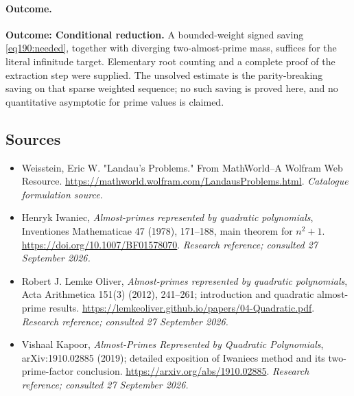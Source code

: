 \documentclass[11pt,a4paper]{article}
\numberwithin{equation}{section}
\begin{document}
\paragraph{Outcome.}
\textbf{Outcome: Conditional reduction.}
A bounded-weight signed saving \eqref{eq190:needed}, together with diverging two-almost-prime mass, suffices for the literal infinitude target. Elementary root counting and a complete proof of the extraction step were supplied. The unsolved estimate is the parity-breaking saving on that sparse weighted sequence; no such saving is proved here, and no quantitative asymptotic for prime values is claimed.

\subsection{Sources}
\begin{itemize}\raggedright
\item[\textnormal{[S1]}]\hypertarget{source:47:1}{} Weisstein, Eric W. "Landau's Problems." From MathWorld--A Wolfram Web Resource.
\url{https://mathworld.wolfram.com/LandausProblems.html}.
{\small\textit{Catalogue formulation source.}}
\item[\textnormal{[E1]}]\hypertarget{extra:47:1}{} Henryk Iwaniec, \emph{Almost-primes represented by quadratic polynomials}, Inventiones Mathematicae 47 (1978), 171--188, main theorem for $n^2+1$.
\url{https://doi.org/10.1007/BF01578070}.
{\small\textit{Research reference; consulted 27 September 2026.}}
\item[\textnormal{[E2]}]\hypertarget{extra:47:2}{} Robert J. Lemke Oliver, \emph{Almost-primes represented by quadratic polynomials}, Acta Arithmetica 151(3) (2012), 241--261; introduction and quadratic almost-prime results.
\url{https://lemkeoliver.github.io/papers/04-Quadratic.pdf}.
{\small\textit{Research reference; consulted 27 September 2026.}}
\item[\textnormal{[E3]}]\hypertarget{extra:47:3}{} Vishaal Kapoor, \emph{Almost-Primes Represented by Quadratic Polynomials}, arXiv:1910.02885 (2019); detailed exposition of Iwaniec\textquotesingle s method and its two-prime-factor conclusion.
\url{https://arxiv.org/abs/1910.02885}.
{\small\textit{Research reference; consulted 27 September 2026.}}
\end{itemize}
\end{document}
